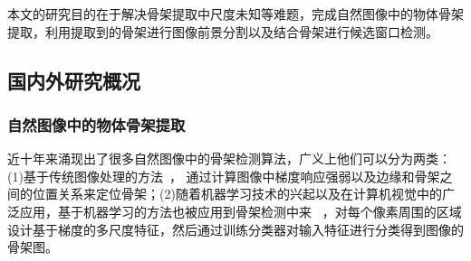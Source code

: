 \documentclass[UTF8]{ctexart}
\numberwithin{equation}{section} %
\numberwithin{table}{section} %
\begin{document}
本文的研究目的在于解决骨架提取中尺度未知等难题，完成自然图像中的物体骨架提取，利用提取到的骨架进行图像前景分割以及结合骨架进行候选窗口检测。

\subsection{国内外研究概况}
\subsubsection{自然图像中的物体骨架提取}
近十年来涌现出了很多自然图像中的骨架检测算法，广义上他们可以分为两类：(1)基于传统图像处理的方法~\cite{jang2001pseudo, lindeberg1998edge, yu2004segmentation, zhang2007accurate}，
通过计算图像中梯度响应强弱以及边缘和骨架之间的位置关系来定位骨架；(2)随着机器学习技术的兴起以及在计算机视觉中的广泛应用，基于机器学习的方法也被应用到骨架检测中来
~\cite{sie2013detecting, levinshtein2013multiscale, sironi2014multiscale, tsogkas2012learning}，对每个像素周围的区域设计基于梯度的多尺度特征，然后通过训练分类器对输入特征进行分类得到图像的骨架图。
\end{document}
